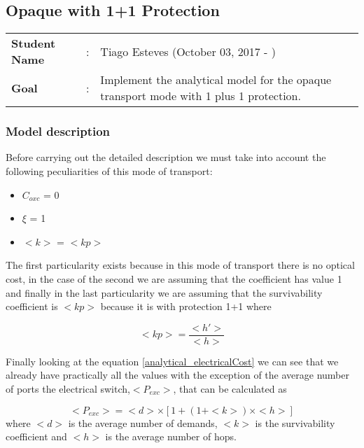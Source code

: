 \clearpage

\subsection{Opaque with 1+1 Protection}\label{analytical_Opaque_Protection}
\begin{tcolorbox}	
\begin{tabular}{p{2.75cm} p{0.2cm} p{10.5cm}} 	
\textbf{Student Name}  &:& Tiago Esteves    (October 03, 2017 - )\\
\textbf{Goal}          &:& Implement the analytical model for the opaque transport mode with 1 plus 1 protection.
\end{tabular}
\end{tcolorbox}

\subsubsection{Model description}

Before carrying out the detailed description we must take into account the following peculiarities of this mode of transport:
\begin{itemize}
  \item $C_{oxc}$ = 0
  \item $\xi$ = 1
  \item $<k>$ = $<kp>$
\end{itemize}

\vspace{11pt}
The first particularity exists because in this mode of transport there is no optical cost, in the case of the second we are assuming that the coefficient has value 1 and finally in the last particularity we are assuming that the survivability coefficient is $<kp>$ because it is with protection 1+1 where

\begin{equation}
<kp> = \frac{<h'>}{<h>}
\label{coefficient_protec}
\end{equation}

\vspace{11pt}
Finally looking at the equation \ref{analytical_electricalCost}  we can see that we already have practically all the values with the exception of the average number of ports the electrical switch,$<P_{exc}>$, that can be calculated as

\begin{equation}
<P_{exc}> = <d> \times [1 + \left(1 + <k>\right) \times <h>]
\label{Pexc_opaque_protec}
\end{equation}
\vspace{11pt}
\noindent
where $<d>$ is the average number of demands, $<k>$	is the survivability coefficient and $<h>$ is the average number of hops.\\


